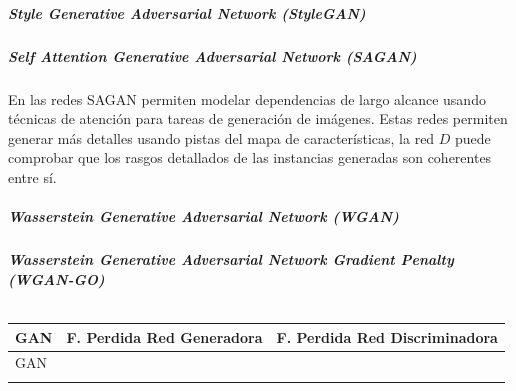 \subparagraph*{Style Generative Adversarial Network (StyleGAN)}

\cite{StyleGAN-karras2019stylebased,StyleGAN-sauer2023stylegant}


\subparagraph*{Self Attention Generative Adversarial Network (SAGAN)}
En las redes \gls{SAGAN} \cite{SAGAN-zhang2018selfattention} permiten modelar dependencias de largo alcance usando técnicas de atención para tareas de generación de imágenes.
Estas redes permiten generar más detalles usando pistas del mapa de características, la red $D$ puede comprobar que los rasgos detallados de las instancias generadas son coherentes entre sí.





\subparagraph*{Wasserstein Generative Adversarial Network (WGAN)}


\subparagraph*{Wasserstein Generative Adversarial Network Gradient Penalty (WGAN-GO)}







\begin{table}[H]
    \begin{center}
        \begin{tabularx}{\textwidth}{|l|X|X|}
            \toprule
            \textbf{GAN} & \textbf{F. Perdida Red Generadora} & \textbf{F. Perdida Red Discriminadora} \\\midrule
            GAN          &                                    &                                        \\
                         &                                    &                                        \\
            \bottomrule
        \end{tabularx}
        \caption{}
        \label{tab:}
    \end{center}
\end{table}




